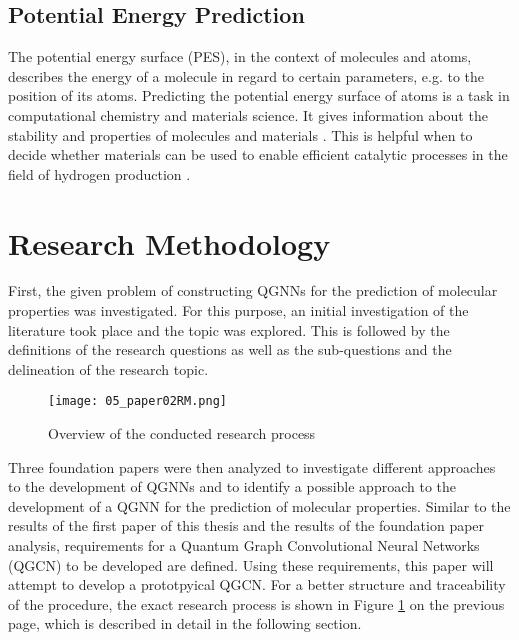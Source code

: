 \subsection{Potential Energy Prediction}
The potential energy surface (PES), in the context of molecules and atoms, describes the energy of a molecule in regard to certain parameters, e.g. to the position of its atoms.    
Predicting the potential energy surface of atoms is a task in computational chemistry and materials science. It gives information about the stability and properties of molecules and materials \cite{liu_computational_2023}. This is helpful when to decide whether materials can be used to enable efficient catalytic processes in the field of hydrogen production \cite{chen_waste-derived_2023}. 

\section{Research Methodology}

First, the given problem of constructing QGNNs for the prediction of molecular properties was investigated. For this purpose, an initial investigation of the literature took place and the topic was explored. This is followed by the definitions of the research questions as well as the sub-questions and the delineation of the research topic. \\

\begin{figure}[h!]
    \centering
    \texttt{[image: 05\_paper02RM.png]}
    \caption[Overview of the conducted research process]{\label{img:paper02rm}{Overview of the conducted research process}}
    \end{figure} 

Three foundation papers were then analyzed to investigate different approaches to the development of QGNNs and to identify a possible approach to the development of a QGNN for the prediction of molecular properties. Similar to the results of the first paper of this thesis and the results of the foundation paper analysis, requirements for a Quantum Graph Convolutional Neural Networks (QGCN) to be developed are defined. Using these requirements, this paper will attempt to develop a prototpyical QGCN. For a better structure and traceability of the procedure, the exact research process is shown in Figure \ref{img:paper02rm} on the previous page, which is described in detail in the following section. \\

